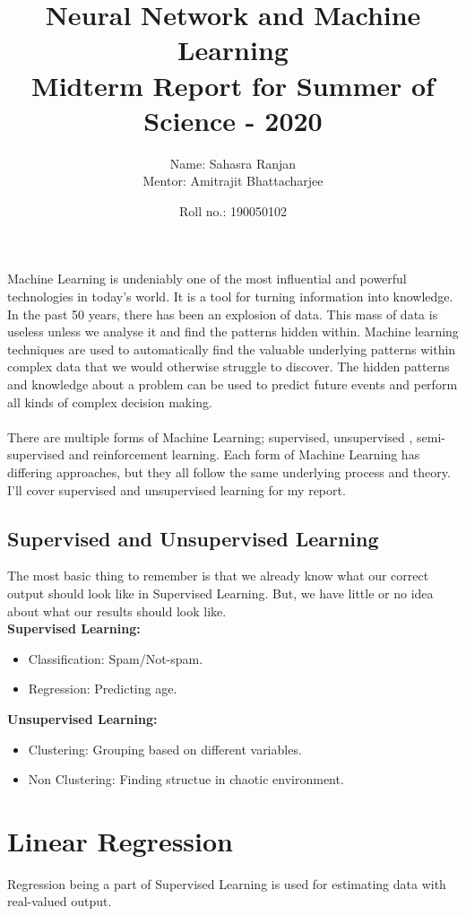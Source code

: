 \documentclass[12pt, A4]{report}
\title{\textbf{Neural Network and Machine Learning}\\\large{Midterm Report for Summer of Science - 2020}}
\author{Name: Sahasra Ranjan\\Mentor: Amitrajit Bhattacharjee}
\date{Roll no.: 190050102}
\begin{document}
\begin{titlepage}
\maketitle
\tableofcontents{}
\end{titlepage}

Machine Learning is undeniably one of the most influential and powerful technologies in today’s world. It is a tool for turning information into knowledge. In the past 50 years, there has been an explosion of data. This mass of data is useless unless we analyse it and find the patterns hidden within. Machine learning techniques are used to automatically find the valuable underlying patterns within complex data that we would otherwise struggle to discover. The hidden patterns and knowledge about a problem can be used to predict future events and perform all kinds of complex decision making.\\\\
There are multiple forms of Machine Learning; supervised, unsupervised , semi-supervised and reinforcement learning. Each form of Machine Learning has differing approaches, but they all follow the same underlying process and theory. I'll cover supervised and unsupervised learning for my report.

\section{Supervised and Unsupervised Learning}
  The most basic thing to remember is that we already know what our correct output should look like in Supervised Learning.
  But, we have little or no idea about what our results should look like.\\

  \textbf{Supervised Learning:}
  \begin{itemize}
    \item Classification: Spam/Not-spam. 
    \item Regression: Predicting age.
  \end{itemize}

  \textbf{Unsupervised Learning:}
  \begin{itemize}
    \item Clustering: Grouping based on different variables.
    \item Non Clustering: Finding structue in chaotic environment.
  \end{itemize}

\chapter{Linear Regression}
  Regression being a part of Supervised Learning is used for estimating data with real-valued output.  
\end{document}
